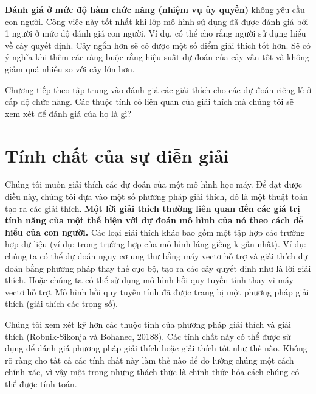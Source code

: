 \textbf{Đánh giá ở mức độ hàm chức năng (nhiệm vụ ủy quyền)} không yêu cầu con người. Công việc này tốt nhất khi lớp mô hình sử dụng đã được đánh giá bởi 1 người ở mức độ đánh giá con người. Ví dụ, có thể cho rằng người sử dụng hiểu về cây quyết định. Cây ngắn hơn sẽ có được một số điểm giải thích tốt hơn. Sẽ có ý nghĩa khi thêm các ràng buộc rằng hiệu suất dự đoán của cây vẫn tốt và không giảm quá nhiều so với cây lớn hơn.


Chương tiếp theo tập trung vào đánh giá các giải thích cho các dự đoán riêng lẻ ở cấp độ chức năng. Các thuộc tính có liên quan của giải thích mà chúng tôi sẽ xem xét để đánh giá của họ là gì?

\clearpage

\section{Tính chất của sự diễn giải}

Chúng tôi muốn giải thích các dự đoán của một mô hình học máy. Để đạt được điều này, chúng tôi dựa vào một số phương pháp giải thích, đó là một thuật toán tạo ra các giải thích. \textbf{Một lời giải thích thường liên quan đến các giá trị tính năng của một thể hiện với dự đoán mô hình của nó theo cách dễ hiểu của con người.} Các loại giải thích khác bao gồm một tập hợp các trường hợp dữ liệu (ví dụ: trong trường hợp của mô hình láng giềng k gần nhất). Ví dụ: chúng ta có thể dự đoán nguy cơ ung thư bằng máy vectơ hỗ trợ và giải thích dự đoán bằng phương pháp thay thế cục bộ, tạo ra các cây quyết định như là lời giải thích. Hoặc chúng ta có thể sử dụng mô hình hồi quy tuyến tính thay vì máy vectơ hỗ trợ. Mô hình hồi quy tuyến tính đã được trang bị một phương pháp giải thích (giải thích các trọng số).

Chúng tôi xem xét kỹ hơn các thuộc tính của phương pháp giải thích và giải thích (Robnik-Sikonja và Bohanec, 20188). Các tính chất này có thể được sử dụng để đánh giá phương pháp giải thích hoặc giải thích tốt như thế nào. Không rõ ràng cho tất cả các tính chất này làm thế nào để đo lường chúng một cách chính xác, vì vậy một trong những thách thức là chính thức hóa cách chúng có thể được tính toán.


